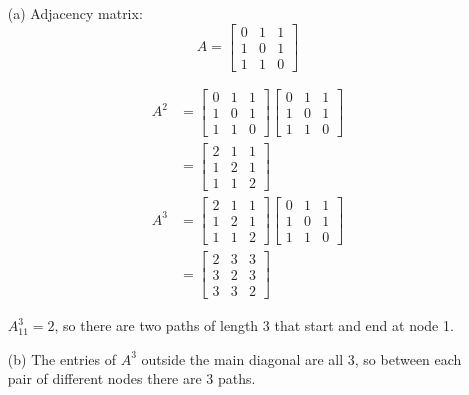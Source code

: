 \documentclass{article}
\begin{document}
\begin{enumerate}
  \item[(a)]
  Adjacency matrix:
  \[
    A =
    \begin{bmatrix}
      0 & 1 & 1 \\
      1 & 0 & 1 \\
      1 & 1 & 0
    \end{bmatrix}
  \]

  \begin{align*}
    A^2 &=
    \begin{bmatrix}
      0 & 1 & 1 \\
      1 & 0 & 1 \\
      1 & 1 & 0
    \end{bmatrix}
    \begin{bmatrix}
      0 & 1 & 1 \\
      1 & 0 & 1 \\
      1 & 1 & 0
    \end{bmatrix} \\
    &=
    \begin{bmatrix}
      2 & 1 & 1 \\
      1 & 2 & 1 \\
      1 & 1 & 2
    \end{bmatrix} \\
    A^3 &=
    \begin{bmatrix}
      2 & 1 & 1 \\
      1 & 2 & 1 \\
      1 & 1 & 2
    \end{bmatrix}
    \begin{bmatrix}
      0 & 1 & 1 \\
      1 & 0 & 1 \\
      1 & 1 & 0
    \end{bmatrix} \\
    &=
    \begin{bmatrix}
      2 & 3 & 3 \\
      3 & 2 & 3 \\
      3 & 3 & 2
    \end{bmatrix}
  \end{align*}

  \( A^3_{11} = 2 \), so there are two paths of length 3 that start and end at
  node 1.

  \item[(b)]
  The entries of \( A^3 \) outside the main diagonal are all 3, so between each
  pair of different nodes there are 3 paths.
\end{enumerate}
\end{document}
